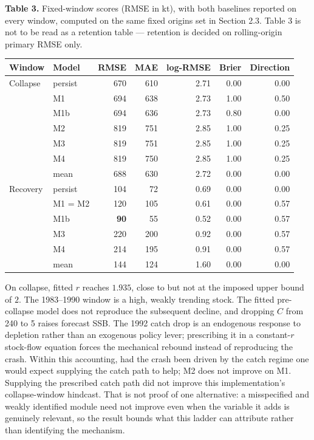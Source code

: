 \documentclass[11pt]{article}
\begin{document}
\textbf{Table 3.} Fixed-window scores (RMSE in kt), with both baselines
reported on every window, computed on the same fixed origins set
in Section 2.3. Table 3 is not to be read as a retention table ---
retention is decided on rolling-origin primary RMSE only.

\begin{longtable}[]{@{}llrrrrr@{}}
\toprule\noalign{}
Window & Model & RMSE & MAE & log-RMSE & Brier & Direction \\
\midrule\noalign{}
\endhead
\bottomrule\noalign{}
\endlastfoot
Collapse & persist & 670 & 610 & 2.71 & 0.00 & 0.00 \\
& M1 & 694 & 638 & 2.73 & 1.00 & 0.50 \\
& M1b & 694 & 636 & 2.73 & 0.80 & 0.00 \\
& M2 & 819 & 751 & 2.85 & 1.00 & 0.25 \\
& M3 & 819 & 751 & 2.85 & 1.00 & 0.25 \\
& M4 & 819 & 750 & 2.85 & 1.00 & 0.25 \\
& mean & 688 & 630 & 2.72 & 0.00 & 0.00 \\
Recovery & persist & 104 & 72 & 0.69 & 0.00 & 0.00 \\
& M1 = M2 & 120 & 105 & 0.61 & 0.00 & 0.57 \\
& M1b & \textbf{90} & 55 & 0.52 & 0.00 & 0.57 \\
& M3 & 220 & 200 & 0.92 & 0.00 & 0.57 \\
& M4 & 214 & 195 & 0.91 & 0.00 & 0.57 \\
& mean & 144 & 124 & 1.60 & 0.00 & 0.00 \\
\end{longtable}

On collapse, fitted \(r\) reaches \(1.935\), close to but not at the
imposed upper bound of \(2\).
The 1983--1990 window is a high, weakly trending stock. The fitted pre-collapse model does not reproduce the subsequent
decline, and dropping \(C\) from 240 to 5 raises forecast SSB. The 1992 catch drop is an
endogenous response to depletion rather than an exogenous policy lever;
prescribing it in a constant-\(r\) stock-flow equation forces the
mechanical rebound instead of reproducing the crash. Within this
accounting, had the crash been driven by the catch regime one would
expect supplying the catch path to help; M2 does not improve on M1. Supplying the prescribed catch path did not improve this
implementation's collapse-window hindcast. That is not proof of one
alternative: a misspecified and weakly identified module need not
improve even when the variable it adds is genuinely relevant, so the
result bounds what this ladder can attribute rather than identifying the
mechanism.
\end{document}
